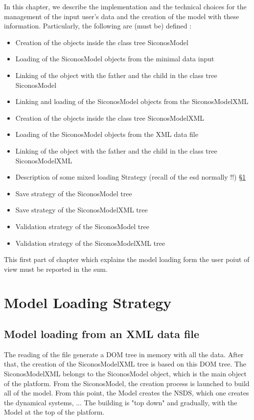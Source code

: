 In this chapter, we describe the implementation and the technical choices for the management of the input user's data and the creation of the model with these information. Particularly, the following are (must be) defined :
\begin{itemize}
\item Creation of the objects inside the class tree SiconosModel
\item Loading of the SiconosModel objects from the minimal data input
\item Linking of the object with the father and the child in the class tree SiconosModel 
\item Linking and loading of the SiconosModel objects from the SiconosModelXML
\item Creation of the objects inside the class tree SiconosModelXML
\item Loading of the SiconosModel objects from the XML data file
\item Linking of the object with the father and the child in the class tree SiconosModelXML
\item Description of some mixed loading Strategy (recall of the \ac{esd} normally !!) \S \ref{Sec:LoadingStrategy}
\item Save strategy of the SiconosModel tree
\item Save strategy of the SiconosModelXML tree
\item Validation strategy of the SiconosModel tree
\item Validation strategy of the SiconosModelXML tree
\end{itemize}


This first  part of chapter which explains  the model loading form the user poiut of view  must be reported in the \ac{sum}. 

\section{Model Loading Strategy}
\label{Sec:LoadingStrategy}


\subsection{Model loading from an  XML data file}
The reading of the file generate a DOM tree in memory with all the data. After that,  the creation of the SiconosModelXML tree is  based on this DOM tree.  The SiconosModelXML belongs to the SiconosModel object, which is the main object of the platform. From the SiconosModel,  the creation process is launched to build  all of the model. From this point, the Model creates the NSDS, which one creates the dynamical systems, ... The building is "top down" and gradually, with the Model at the top of the platform. 





